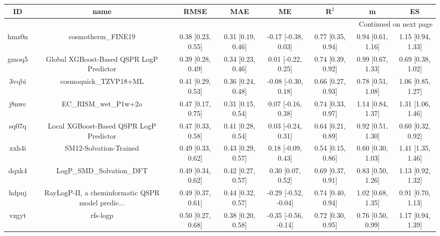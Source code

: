 \documentclass{article}
\begin{document}
\begin{center}
\begin{longtable}{|cccccccc|}
\toprule
    ID &                                               name &               RMSE &                MAE &                    ME &              R$^2$ &                    m &                    ES \\
\midrule
\endhead
\midrule
\multicolumn{8}{r}{{Continued on next page}} \\
\midrule
\endfoot

\bottomrule
\endlastfoot
 hmz0n &                                 cosmotherm\_FINE19 &  0.38 [0.23, 0.55] &  0.31 [0.19, 0.46] &   -0.17 [-0.38, 0.03] &  0.77 [0.35, 0.94] &    0.94 [0.61, 1.16] &     1.15 [0.94, 1.33] \\
 gmoq5 &           Global XGBoost-Based QSPR LogP Predictor &  0.39 [0.28, 0.49] &  0.34 [0.23, 0.46] &    0.01 [-0.22, 0.25] &  0.74 [0.39, 0.92] &    0.99 [0.67, 1.33] &     0.69 [0.38, 1.02] \\
 3vqbi &                              cosmoquick\_TZVP18+ML &  0.41 [0.29, 0.53] &  0.36 [0.24, 0.48] &   -0.08 [-0.30, 0.18] &  0.66 [0.27, 0.93] &    0.78 [0.51, 1.08] &     1.06 [0.85, 1.27] \\
 j8nwc &                              EC\_RISM\_wet\_P1w+2o &  0.47 [0.17, 0.75] &  0.31 [0.15, 0.54] &    0.07 [-0.16, 0.38] &  0.74 [0.33, 0.97] &    1.14 [0.84, 1.37] &     1.31 [1.06, 1.46] \\
 sq07q &            Local XGBoost-Based QSPR LogP Predictor &  0.47 [0.33, 0.58] &  0.41 [0.28, 0.54] &    0.03 [-0.24, 0.31] &  0.64 [0.21, 0.89] &    0.92 [0.51, 1.30] &     0.60 [0.32, 0.92] \\
 xxh4i &                             SM12-Solvation-Trained &  0.49 [0.33, 0.62] &  0.43 [0.29, 0.57] &    0.18 [-0.09, 0.43] &  0.54 [0.15, 0.86] &    0.60 [0.30, 1.03] &     1.41 [1.35, 1.46] \\
 dqxk4 &                          LogP\_SMD\_Solvation\_DFT &  0.49 [0.34, 0.62] &  0.42 [0.27, 0.57] &     0.30 [0.07, 0.52] &  0.69 [0.37, 0.91] &    0.83 [0.50, 1.26] &     1.13 [0.92, 1.32] \\
 hdpuj &  RayLogP-II, a cheminformatic QSPR model predic... &  0.49 [0.37, 0.61] &  0.44 [0.32, 0.57] &  -0.29 [-0.52, -0.04] &  0.74 [0.40, 0.94] &    1.02 [0.68, 1.35] &     0.91 [0.70, 1.13] \\
 vzgyt &                                           rfs-logp &  0.50 [0.27, 0.68] &  0.38 [0.20, 0.58] &  -0.35 [-0.56, -0.14] &  0.72 [0.30, 0.95] &    0.76 [0.50, 0.99] &     1.17 [0.94, 1.39] \\

\end{longtable}
\end{center}
\end{document}
